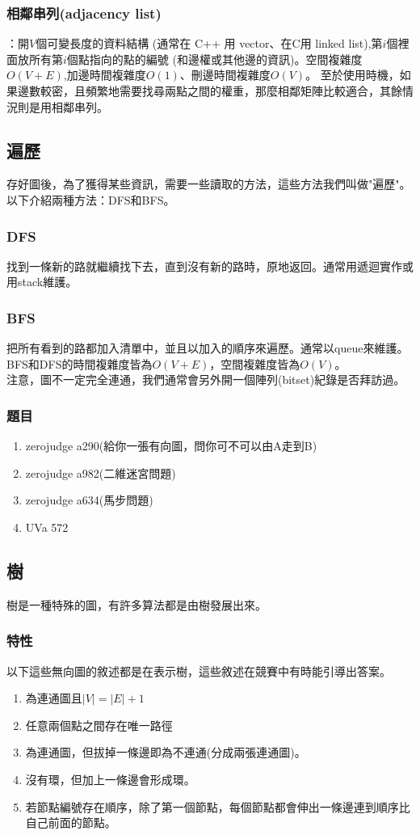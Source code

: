 \subsubsection{相鄰串列(adjacency list)}：開$V$個可變長度的資料結構 (通常在 C++ 用 vector、在C用 linked list),第$i$個裡面放所有第$i$個點指向的點的編號 (和邊權或其他邊的資訊)。空間複雜度$O(V + E)$,加邊時間複雜度$O(1)$、刪邊時間複雜度$O(V)$。
至於使用時機，如果邊數較密，且頻繁地需要找尋兩點之間的權重，那麼相鄰矩陣比較適合，其餘情況則是用相鄰串列。
\subsection{遍歷}
存好圖後，為了獲得某些資訊，需要一些讀取的方法，這些方法我們叫做"遍歷"。以下介紹兩種方法：DFS和BFS。
\subsubsection{DFS}
找到一條新的路就繼續找下去，直到沒有新的路時，原地返回。通常用遞迴實作或用stack維護。

\subsubsection{BFS}

把所有看到的路都加入清單中，並且以加入的順序來遍歷。通常以queue來維護。\\
BFS和DFS的時間複雜度皆為$O(V+E)$，空間複雜度皆為$O(V)$。\\
注意，圖不一定完全連通，我們通常會另外開一個陣列(bitset)紀錄是否拜訪過。
\subsubsection{題目}
\begin{enumerate}
\item zerojudge a290(給你一張有向圖，問你可不可以由A走到B)
\item zerojudge a982(二維迷宮問題)
\item zerojudge a634(馬步問題)
\item UVa 572
\end{enumerate}
\subsection{樹}
樹是一種特殊的圖，有許多算法都是由樹發展出來。
\subsubsection{特性}
以下這些無向圖的敘述都是在表示樹，這些敘述在競賽中有時能引導出答案。
\begin{enumerate}
\item 為連通圖且$|V|=|E|+1$
\item 任意兩個點之間存在唯一路徑
\item 為連通圖，但拔掉一條邊即為不連通(分成兩張連通圖)。
\item 沒有環，但加上一條邊會形成環。
\item 若節點編號存在順序，除了第一個節點，每個節點都會伸出一條邊連到順序比自己前面的節點。
\end{enumerate}
